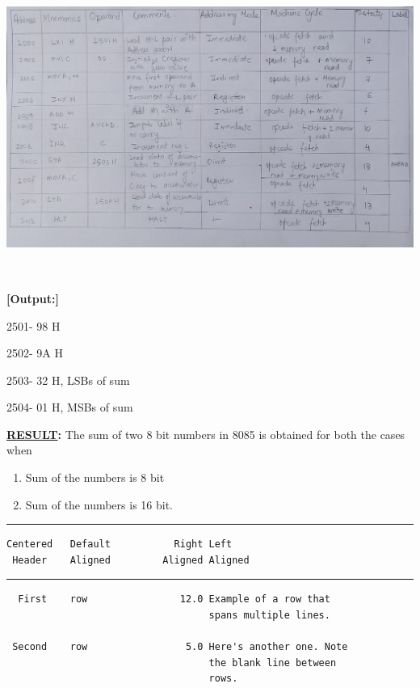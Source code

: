 \documentclass[11pt,twocolumn]{article}
\begin{document}
\includegraphics[width=6.5in,height=3.84722in]{media/image4.jpg}

\textbf{{[}Output:{]}}

2501- 98 H

2502- 9A H

2503- 32 H, LSBs of sum

2504- 01 H, MSBs of sum

\textbf{\href{}{RESULT}:} The sum of two 8 bit numbers in 8085 is
obtained for both the cases when

\begin{enumerate}
\def\labelenumi{\alph{enumi})}
\item
  Sum of the numbers is 8 bit
\item
  Sum of the numbers is 16 bit.
\end{enumerate}

\begin{center}\rule{0.5\linewidth}{0.5pt}\end{center}

\begin{verbatim}
Centered   Default           Right Left
 Header    Aligned         Aligned Aligned
\end{verbatim}

\begin{center}\rule{0.5\linewidth}{0.5pt}\end{center}

\begin{verbatim}
  First    row                12.0 Example of a row that
                                   spans multiple lines.

 Second    row                 5.0 Here's another one. Note
                                   the blank line between
                                   rows.
\end{verbatim}
\end{document}
